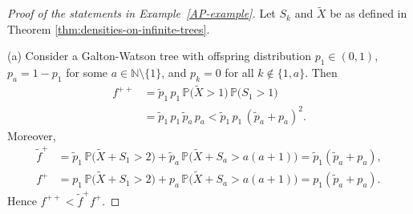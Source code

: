 \documentclass[11pt]{article}
\numberwithin{equation}{section}
\theoremstyle{plain}
\newcommand{\N}{\mathbb N}
\newcommand{\PP}{\mathbb{P}}
\newcommand{\tX}{\tilde{X}}
\begin{document}
\begin{proof}[Proof of the statements in Example~\ref{AP-example}]
Let $S_k$ and $\tilde{X}$ be as defined in Theorem \ref{thm:densities-on-infinite-trees}. 

\medskip\noindent 
(a) Consider a Galton-Watson tree with offspring distribution $p_1\in (0,1)$, $p_a = 1-p_1$ for some $a \in \N\setminus\{1\}$, and $p_k = 0$ for all $k \notin \{1,a\}$. Then
\begin{align*}
f^{++}&=\tilde{p}_1\,p_1\,\PP\big(\tX >1\big)\,\PP\big(S_{1}>1\big)\\
&=\tilde{p}_1\,p_1\,\tilde{p}_a\,p_a <\tilde{p}_1\,p_1\,(\tilde{p}_a+p_a)^{2}.
\end{align*}
Moreover,
\begin{align*}
\tilde{f}^{+}
&=\tilde{p}_1\,\PP\big(\tX +S_{1} >2\big)+\tilde{p}_a\,\PP\big(\tX +S_{a} >a(a+1)\big) =\tilde{p}_1(\tilde{p}_a+p_a ),\\
f^{+}
&=p_1\,\PP\big(\tX +S_{1} >2\big)+p_a\,\PP\big(\tX +S_{a} >a(a+1)\big) =p_1(\tilde{p}_a+p_a ).
\end{align*}
Hence $f^{++}<\tilde{f}^{+}f^{+}$.


\end{proof}
\end{document}
